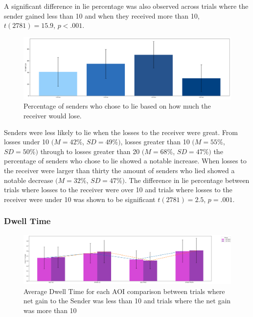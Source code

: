 \documentclass[man, floatsintext]{apa7}
\begin{document}
A significant difference in lie percentage was also observed across trials where the sender gained less than 10 and when they received more than 10, $t(2781)=15.9$, $p<.001$.

\begin{figure}[H]
	\includegraphics[width=\linewidth]{../plots/RESPONSE/NetLossLie.png}
	\caption{Percentage of senders who chose to lie based on how much the receiver would lose.}
	\label{fig:NetLossLie}
\end{figure}

Senders were less likely to lie when the losses to the receiver were great. From losses under 10 $(M = 42\%$, $SD = 49\%)$, losses greater than 10 $(M = 55\%$, $SD = 50\%)$ through to losses greater than 20 $(M = 68\%$, $SD = 47\%)$ the percentage of senders who chose to lie showed a notable increase. When losses to the receiver were larger than thirty the amount of senders who lied showed a notable decrease $(M = 32\%$, $SD = 47\%)$. The difference in lie percentage between trials where losses to the receiver were over 10 and trials where losses to the receiver were under 10 was shown to be significant $t(2781)=2.5$, $p=.001$.

\subsubsection{Dwell Time}

\begin{figure}[H]
	\includegraphics[width=\linewidth]{../plots/RESPONSE/AvgDwellPerGain.png}
	\caption{Average Dwell Time for each AOI comparison between trials where net gain to the Sender was less than 10 and trials where the net gain was more than 10}
	\label{fig:AvgDwellPerGain}
\end{figure}
\end{document}
